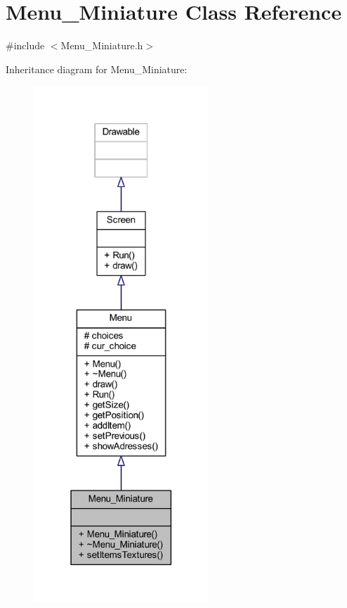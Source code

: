 \hypertarget{class_menu___miniature}{}\section{Menu\+\_\+\+Miniature Class Reference}
\label{class_menu___miniature}


{\ttfamily \#include $<$Menu\+\_\+\+Miniature.\+h$>$}



Inheritance diagram for Menu\+\_\+\+Miniature\+:\nopagebreak
\begin{figure}[H]
\begin{center}
\leavevmode
\includegraphics[height=550pt]{class_menu___miniature__inherit__graph}
\end{center}
\end{figure}


